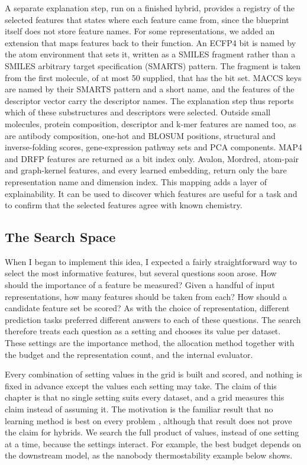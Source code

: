 A separate explanation step, run on a finished hybrid, provides a registry of the selected features that states where each feature came from, since the blueprint itself does not store feature names. For some representations, we added an extension that maps features back to their function. An ECFP4 bit is named by the atom environment that sets it, written as a SMILES fragment rather than a SMILES arbitrary target specification (SMARTS) pattern. The fragment is taken from the first molecule, of at most 50 supplied, that has the bit set. MACCS keys are named by their SMARTS pattern and a short name, and the features of the descriptor vector carry the descriptor names. The explanation step thus reports which of these substructures and descriptors were selected. Outside small molecules, protein composition, descriptor and k-mer features are named too, as are antibody composition, one-hot and BLOSUM positions, structural and inverse-folding scores, gene-expression pathway sets and PCA components. MAP4 and DRFP features are returned as a bit index only. Avalon, Mordred, atom-pair and graph-kernel features, and every learned embedding, return only the bare representation name and dimension index. This mapping adds a layer of explainability. It can be used to discover which features are useful for a task and to confirm that the selected features agree with known chemistry.

\subsection{The Search Space}

When I began to implement this idea, I expected a fairly straightforward way to select the most informative features, but several questions soon arose. How should the importance of a feature be measured? Given a handful of input representations, how many features should be taken from each? How should a candidate feature set be scored? As with the choice of representation, different prediction tasks preferred different answers to each of these questions. The search therefore treats each question as a setting and chooses its value per dataset. These settings are the importance method, the allocation method together with the budget and the representation count, and the internal evaluator.

Every combination of setting values in the grid is built and scored, and nothing is fixed in advance except the values each setting may take. The claim of this chapter is that no single setting suits every dataset, and a grid measures this claim instead of assuming it. The motivation is the familiar result that no learning method is best on every problem \citep{Wolpert1996}, although that result does not prove the claim for hybrids. We search the full product of values, instead of one setting at a time, because the settings interact. For example, the best budget depends on the downstream model, as the nanobody thermostability example below shows.

